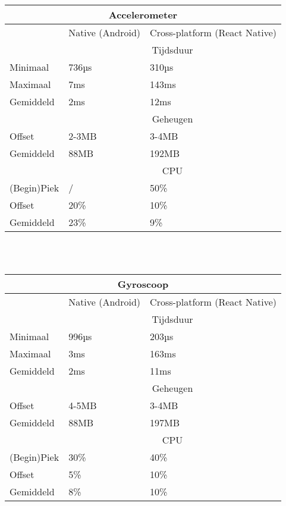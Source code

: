 \begin{tabular}{ |p{3cm}||p{5cm}|p{5cm}| }
    \hline
    \multicolumn{3}{|c|}{Accelerometer} \\ 
    \hline
     & Native (Android) & Cross-platform (React Native) \\
    \hline
     & \multicolumn{2}{|c|}{Tijdsduur} \\
    \hline
    Minimaal & 736µs & 310µs \\
    Maximaal & 7ms & 143ms \\
    Gemiddeld & 2ms & 12ms \\
    \hline
     & \multicolumn{2}{|c|}{Geheugen} \\ 
    \hline
    Offset & 2-3MB & 3-4MB \\
    Gemiddeld & 88MB & 192MB \\
    \hline
     & \multicolumn{2}{|c|}{CPU} \\
    \hline
    (Begin)Piek & / & 50\% \\
    Offset & 20\% & 10\% \\
    Gemiddeld & 23\% & 9\% \\
    \hline
\end{tabular}
\\\\
\begin{tabular}{ |p{3cm}||p{5cm}|p{5cm}| }
    \hline
    \multicolumn{3}{|c|}{Gyroscoop} \\ 
    \hline
     & Native (Android) & Cross-platform (React Native) \\
    \hline
     & \multicolumn{2}{|c|}{Tijdsduur} \\
    \hline
    Minimaal & 996µs & 203µs \\
    Maximaal & 3ms & 163ms \\
    Gemiddeld & 2ms & 11ms \\
    \hline
     & \multicolumn{2}{|c|}{Geheugen} \\ 
    \hline
    Offset & 4-5MB & 3-4MB \\
    Gemiddeld & 88MB & 197MB \\
    \hline
     & \multicolumn{2}{|c|}{CPU} \\
    \hline
    (Begin)Piek & 30\% & 40\% \\
    Offset & 5\% & 10\% \\
    Gemiddeld & 8\% & 10\% \\
    \hline
\end{tabular}
\\\\
